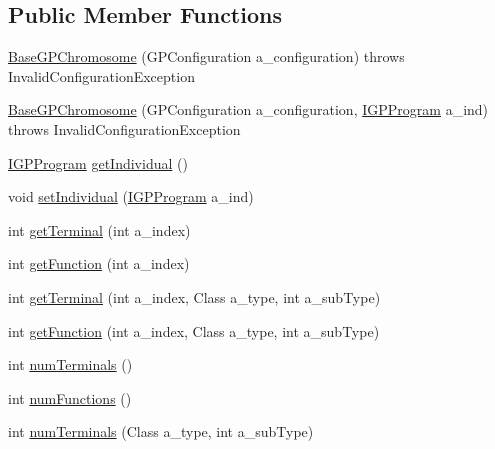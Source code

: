 \subsection*{Public Member Functions}
\begin{DoxyCompactItemize}
\item 
\hyperlink{classorg_1_1jgap_1_1gp_1_1_base_g_p_chromosome_a3a61509cd85185506992df4e6a34eee9}{Base\-G\-P\-Chromosome} (G\-P\-Configuration a\-\_\-configuration)  throws Invalid\-Configuration\-Exception 
\item 
\hyperlink{classorg_1_1jgap_1_1gp_1_1_base_g_p_chromosome_ae675ec47db0ce8fd88b6ac3f2235ba6c}{Base\-G\-P\-Chromosome} (G\-P\-Configuration a\-\_\-configuration, \hyperlink{interfaceorg_1_1jgap_1_1gp_1_1_i_g_p_program}{I\-G\-P\-Program} a\-\_\-ind)  throws Invalid\-Configuration\-Exception 
\item 
\hyperlink{interfaceorg_1_1jgap_1_1gp_1_1_i_g_p_program}{I\-G\-P\-Program} \hyperlink{classorg_1_1jgap_1_1gp_1_1_base_g_p_chromosome_a13d8f2e469a316fd02a863a1d924ad5d}{get\-Individual} ()
\item 
void \hyperlink{classorg_1_1jgap_1_1gp_1_1_base_g_p_chromosome_adef0faa3a73f86c1fe91af2f15c2d514}{set\-Individual} (\hyperlink{interfaceorg_1_1jgap_1_1gp_1_1_i_g_p_program}{I\-G\-P\-Program} a\-\_\-ind)
\item 
int \hyperlink{classorg_1_1jgap_1_1gp_1_1_base_g_p_chromosome_a0c2122b764f1957c28e418a27a062f08}{get\-Terminal} (int a\-\_\-index)
\item 
int \hyperlink{classorg_1_1jgap_1_1gp_1_1_base_g_p_chromosome_af1de58df592374bed5f5765988e37f6e}{get\-Function} (int a\-\_\-index)
\item 
int \hyperlink{classorg_1_1jgap_1_1gp_1_1_base_g_p_chromosome_a9bc14b556db8f5e4c05e1a4af5424828}{get\-Terminal} (int a\-\_\-index, Class a\-\_\-type, int a\-\_\-sub\-Type)
\item 
int \hyperlink{classorg_1_1jgap_1_1gp_1_1_base_g_p_chromosome_a1d10424ef765a2f738593b06a476a193}{get\-Function} (int a\-\_\-index, Class a\-\_\-type, int a\-\_\-sub\-Type)
\item 
int \hyperlink{classorg_1_1jgap_1_1gp_1_1_base_g_p_chromosome_af454a483e125909d9a4f9b06c5ec8e98}{num\-Terminals} ()
\item 
int \hyperlink{classorg_1_1jgap_1_1gp_1_1_base_g_p_chromosome_ab46c095e367ecc9d40b3a7646571e61c}{num\-Functions} ()
\item 
int \hyperlink{classorg_1_1jgap_1_1gp_1_1_base_g_p_chromosome_abd24b5ee2a8e7552a724303706c5b978}{num\-Terminals} (Class a\-\_\-type, int a\-\_\-sub\-Type)

\end{DoxyCompactItemize}
